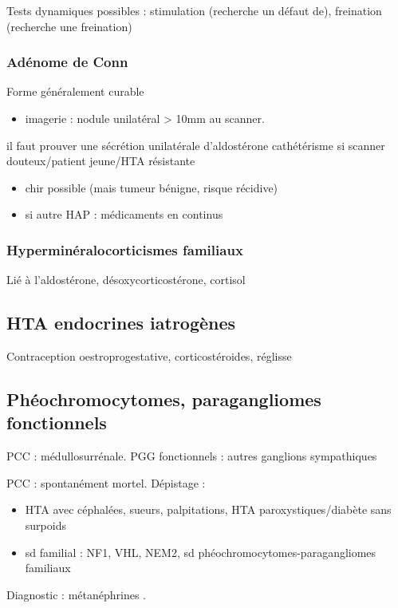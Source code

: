 \documentclass[11pt]{article}
\begin{document}
Tests dynamiques possibles : stimulation (recherche un défaut de), freination
(recherche une freination)

\subsubsection{Adénome de Conn}
\label{sec:orgb1316a0}
Forme généralement curable
\begin{itemize}
\item imagerie : nodule unilatéral > 10mm au scanner.
\end{itemize}
\danger il faut prouver une sécrétion unilatérale d'aldostérone \thus
cathétérisme si scanner douteux/patient jeune/HTA résistante
\begin{itemize}
\item chir possible (mais tumeur bénigne, risque récidive)
\item si autre HAP : médicaments en continus
\end{itemize}

\subsubsection{Hyperminéralocorticismes familiaux}
\label{sec:orgdf710e2}
Lié à l'aldostérone, désoxycorticostérone, cortisol

\subsection{HTA endocrines iatrogènes}
\label{sec:org7120b1a}
Contraception oestroprogestative, corticostéroides, réglisse

\subsection{Phéochromocytomes, paragangliomes fonctionnels}
\label{sec:org32ad6f9}
\gls{PCC} : médullosurrénale. \gls{PGG} fonctionnels : autres    ganglions sympathiques

PCC : spontanément mortel. Dépistage :
\begin{itemize}
\item HTA avec céphalées, sueurs, palpitations, HTA paroxystiques/diabète sans
surpoids
\item sd familial : \gls{NF1}, \gls{VHL}, \gls{NEM2}, sd phéochromocytomes-paragangliomes familiaux
\end{itemize}

Diagnostic : métanéphrines \inc.
\end{document}

